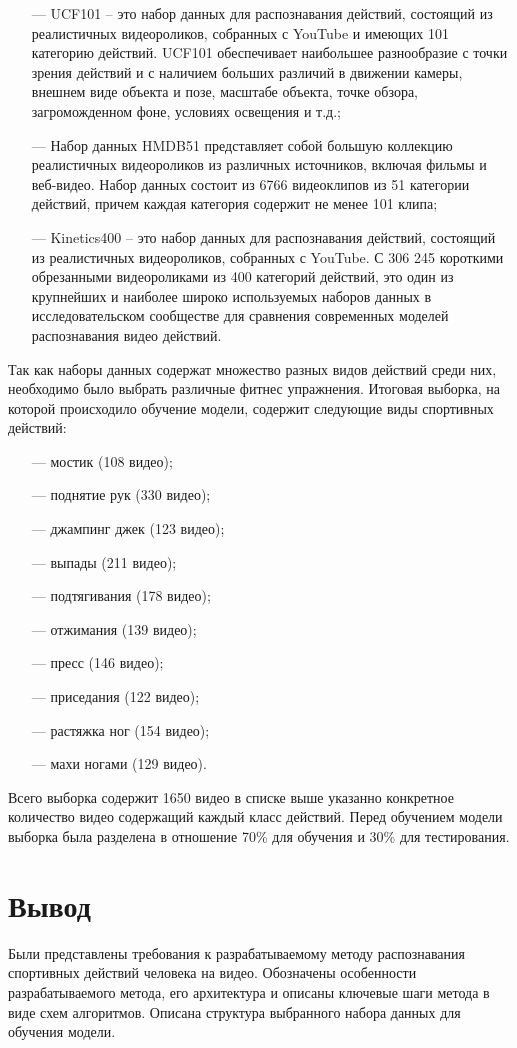 \begin{itemize}
	\item[---] UCF101 -- это набор данных для распознавания действий, состоящий из реалистичных видеороликов, собранных с YouTube и имеющих 101 категорию действий. UCF101 обеспечивает наибольшее разнообразие с точки зрения действий и с наличием больших различий в движении камеры, внешнем виде объекта и позе, масштабе объекта, точке обзора, загроможденном фоне, условиях освещения и т.д.;
	\item[---] Набор данных HMDB51 представляет собой большую коллекцию реалистичных видеороликов из различных источников, включая фильмы и веб-видео. Набор данных состоит из 6766 видеоклипов из 51 категории действий, причем каждая категория содержит не менее 101 клипа;
	\item[---] Kinetics400 -- это набор данных для распознавания действий, состоящий из реалистичных видеороликов, собранных с YouTube. С 306 245 короткими обрезанными видеороликами из 400 категорий действий, это один из крупнейших и наиболее широко используемых наборов данных в исследовательском сообществе для сравнения современных моделей распознавания видео действий.
	
\end{itemize}

Так как наборы данных  содержат множество разных видов действий среди них, необходимо было выбрать различные фитнес упражнения. Итоговая выборка, на которой происходило обучение модели, содержит следующие виды спортивных действий:

\begin{itemize}
	\item[---] мостик (108 видео);
	\item[---] поднятие рук (330 видео);
	\item[---] джампинг джек (123 видео);
	\item[---] выпады (211 видео);
	\item[---] подтягивания (178 видео);
	\item[---] отжимания (139 видео);
	\item[---] пресс (146 видео);
	\item[---] приседания (122 видео);
	\item[---] растяжка ног (154 видео);	
	\item[---] махи ногами (129 видео).
\end{itemize}

Всего выборка содержит 1650 видео в списке выше указанно конкретное количество видео содержащий каждый класс действий. Перед обучением модели выборка была разделена в отношение 70\% для обучения и 30\% для тестирования.


\section*{Вывод}
Были представлены требования к разрабатываемому методу распознавания спортивных действий человека на видео.
Обозначены особенности разрабатываемого  метода, его архитектура и описаны ключевые шаги метода в виде схем алгоритмов.
Описана структура выбранного набора данных для обучения модели.
